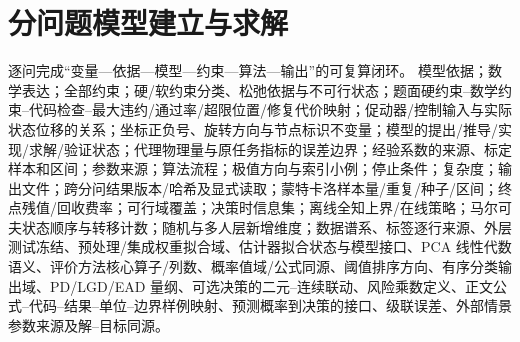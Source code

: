 \documentclass[withoutpreface,bwprint]{cumcmthesis}
\newif\ifmcmguidance
\newcommand{\MCMGuideField}[2]{\par\noindent\textbf{#1：}#2}
\newcommand{\MCMGuide}[7]{%
  \ifmcmguidance
    \begin{mcmguidebox}
      \small\color{black}
      {\color{mcmguidehead}\bfseries 写作指引}
      \MCMGuideField{目标}{#1}
      \MCMGuideField{必备清单}{#2}
      \MCMGuideField{语言风格}{#3}
      \MCMGuideField{篇幅与排版}{#4}
      \MCMGuideField{图表位置}{#5}
      \MCMGuideField{高分点}{#6}
      \MCMGuideField{错误警示}{#7}
    \end{mcmguidebox}
  \fi
}
\begin{document}
\section{分问题模型建立与求解}
\MCMGuide
  {逐问完成“变量—依据—模型—约束—算法—输出”的可复算闭环。}
  {模型依据；数学表达；全部约束；硬/软约束分类、松弛依据与不可行状态；题面硬约束--数学约束--代码检查--最大违约/通过率/超限位置/修复代价映射；促动器/控制输入与实际状态位移的关系；坐标正负号、旋转方向与节点标识不变量；模型的提出/推导/实现/求解/验证状态；代理物理量与原任务指标的误差边界；经验系数的来源、标定样本和区间；参数来源；算法流程；极值方向与索引小例；停止条件；复杂度；输出文件；跨分问结果版本/哈希及显式读取；蒙特卡洛样本量/重复/种子/区间；终点残值/回收费率；可行域覆盖；决策时信息集；离线全知上界/在线策略；马尔可夫状态顺序与转移计数；随机与多人层新增维度；数据谱系、标签逐行来源、外层测试冻结、预处理/集成权重拟合域、估计器拟合状态与模型接口、PCA 线性代数语义、评价方法核心算子/列数、概率值域/公式同源、阈值排序方向、有序分类输出域、PD/LGD/EAD 量纲、可选决策的二元--连续联动、风险乘数定义、正文公式--代码--结果--单位--边界样例映射、预测概率到决策的接口、级联误差、外部情景参数来源及解--目标同源。}
\end{document}
